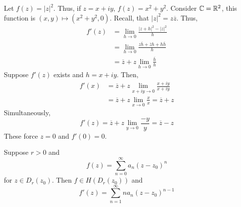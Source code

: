 \documentclass[12pt]{amsart}
\begin{document}
\begin{example}
    Let $f(z) = |z|^2$. Thus, if $z = x+iy$, $f(z) = x^2 + y^2$. Consider $\mathbb C = \mathbb R^2$, this function is $(x, y) \mapsto (x^2 + y^2, 0)$. Recall, that $|z|^2 = z\overline{z}$. Thus, 
    \begin{align*}
        f'(z) &= \lim_{h \to 0} \frac{|z+h|^2 - |z|^2}{h} \\
        &= \lim_{h \to 0} \frac{z\overline h + \overline z h + h \overline h}{h}\\
        &= \overline{z} + z \lim_{h \to 0 }\frac{\overline h}{h}
    \end{align*}
    Suppose $f'(z)$ exists and $h = x+iy$. Then, 
    \begin{align*}
        f'(x) &= \overline{z} + z\lim_{x+iy \to 0} \frac{x+iy}{x+iy} \\
        &= \overline{z} + z \lim_{x \to 0} \frac{x}{x} = \overline{z} + z
    \end{align*}
    Simultaneously, 
    \[ f'(z) = \overline{z} + z\lim_{y\to 0} \frac{-y}{y} = \overline{z} - z\]
    These force $z = 0$ and $f'(0) = 0$. 
\end{example}

\begin{theorem}[W 2.4]
    Suppose $r > 0$ and
    \[ f(z) = \sum_{n = 0}^\infty a_n(z-z_0)^n\]
    for $z \in D_r(z_0)$.  Then $f \in H(D_r(z_0))$ and 
    \[ f'(z) = \sum_{n=1}^\infty na_n(z-z_0)^{n-1}\]
\end{theorem}
\end{document}
